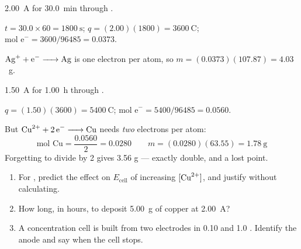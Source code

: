 \documentclass{apchem-notes}
\begin{document}
\begin{workedexample}
\SI{2.00}{\ampere} for \SI{30.0}{\minute} through .

$t = 30.0 \times 60 = \SI{1800}{\second}$;
$q = (2.00)(1800) = \SI{3600}{\coulomb}$;
$\text{mol e}^- = 3600/96485 = 0.0373$.

$\ce{Ag+ + e^- -> Ag}$ is one electron per atom, so
$m = (0.0373)(107.87) = \mathbf{4.03}$~g.
\end{workedexample}

\begin{workedexample}
\SI{1.50}{\ampere} for \SI{1.00}{\hour} through .

$q = (1.50)(3600) = \SI{5400}{\coulomb}$;
$\text{mol e}^- = 5400/96485 = 0.0560$.

But $\ce{Cu^2+ + 2e^- -> Cu}$ needs \emph{two} electrons per atom:
\[ \text{mol Cu} = \frac{0.0560}{2} = 0.0280 \qquad
   m = (0.0280)(63.55) = \mathbf{1.78}~\text{g} \]
Forgetting to divide by 2 gives 3.56 g --- exactly double, and a lost
point.
\end{workedexample}


\begin{enumerate}[leftmargin=*,itemsep=0.4em]
  \item For , predict the effect on
        $E_{\text{cell}}$ of increasing $[\ce{Cu^2+}]$, and justify without
        calculating. 
  \item How long, in hours, to deposit \SI{5.00}{\gram} of copper at
        \SI{2.00}{\ampere}? \workspace[2.6cm]
  \item A concentration cell is built from two  electrodes in
        \SI{0.10}{\Molar} and \SI{1.0}{\Molar} . Identify the
        anode and say when the cell stops.
\end{enumerate}
\end{document}
